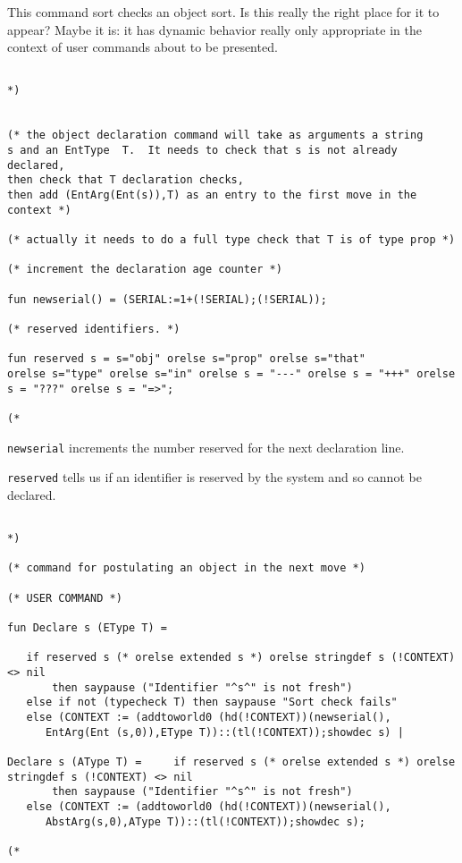 \documentclass{article}
\begin{document}
This command sort checks an object sort.  Is this really the right place for it to appear?  Maybe it is:  it has dynamic behavior really only appropriate
in the context of user commands about to be presented.

\begin{verbatim}

*)


(* the object declaration command will take as arguments a string
s and an EntType  T.  It needs to check that s is not already declared, 
then check that T declaration checks, 
then add (EntArg(Ent(s)),T) as an entry to the first move in the context *)

(* actually it needs to do a full type check that T is of type prop *)

(* increment the declaration age counter *)

fun newserial() = (SERIAL:=1+(!SERIAL);(!SERIAL));

(* reserved identifiers. *)

fun reserved s = s="obj" orelse s="prop" orelse s="that" 
orelse s="type" orelse s="in" orelse s = "---" orelse s = "+++" orelse s = "???" orelse s = "=>";

(*

\end{verbatim}

{\tt newserial} increments the number reserved for the next declaration line.

{\tt reserved} tells us if an identifier is reserved by the system and so cannot be declared.

\begin{verbatim}

*)

(* command for postulating an object in the next move *)

(* USER COMMAND *)

fun Declare s (EType T) =

   if reserved s (* orelse extended s *) orelse stringdef s (!CONTEXT) <> nil 
       then saypause ("Identifier "^s^" is not fresh")
   else if not (typecheck T) then saypause "Sort check fails"
   else (CONTEXT := (addtoworld0 (hd(!CONTEXT))(newserial(),
      EntArg(Ent (s,0)),EType T))::(tl(!CONTEXT));showdec s) |

Declare s (AType T) =     if reserved s (* orelse extended s *) orelse stringdef s (!CONTEXT) <> nil 
       then saypause ("Identifier "^s^" is not fresh")
   else (CONTEXT := (addtoworld0 (hd(!CONTEXT))(newserial(),
      AbstArg(s,0),AType T))::(tl(!CONTEXT));showdec s);

(*

\end{verbatim}
\end{document}
